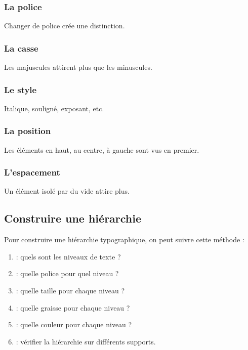 \subsubsection{La police}

Changer de police crée une distinction.

\subsubsection{La casse}

Les majuscules attirent plus que les minuscules.

\subsubsection{Le style}

Italique, souligné, exposant, etc.

\subsubsection{La position}

Les éléments en haut, au centre, à gauche sont vus en premier.

\subsubsection{L'espacement}

Un élément isolé par du vide attire plus.

\subsection{Construire une hiérarchie}

Pour construire une hiérarchie typographique, on peut suivre cette méthode :

\begin{enumerate}
    \item {} : quels sont les niveaux de texte ?
    \item {} : quelle police pour quel niveau ?
    \item {} : quelle taille pour chaque niveau ?
    \item {} : quelle graisse pour chaque niveau ?
    \item {} : quelle couleur pour chaque niveau ?
    \item {} : vérifier la hiérarchie sur différents supports.
\end{enumerate}

